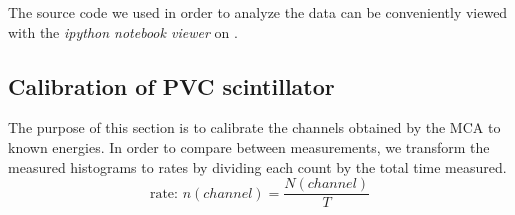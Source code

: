 The source code we used in order to analyze the data can be conveniently viewed with the 
\textit{ipython notebook viewer} on \cite{FPII_compton}.  


\subsection{Calibration of PVC scintillator}
\label{sub:calibration}
The purpose of this section is to calibrate the channels obtained by the MCA to
known energies. In order to compare between measurements, we transform the measured 
histograms to rates by dividing each count by the total time measured. 
\begin{equation}
    \text{rate: } n(channel)  = 	\frac{N(channel)}{T}
    \label{eq:rate}
\end{equation}

